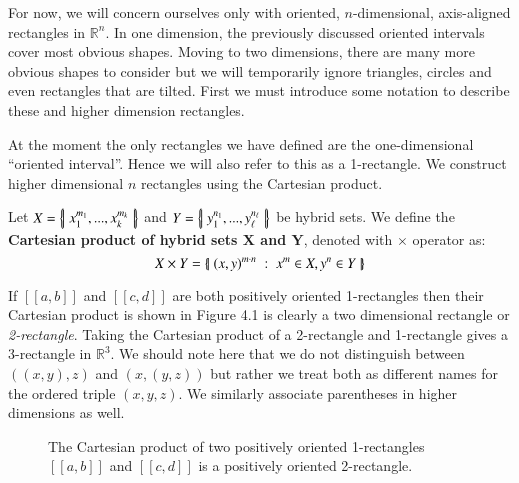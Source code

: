 For now, we will concern ourselves only with oriented, $n$-dimensional, axis-aligned rectangles in $\mathbb{R}^n$.
In one dimension, the previously discussed oriented intervals cover most obvious shapes.
Moving to two dimensions, there are many more obvious shapes to consider but we will temporarily ignore triangles, circles and even rectangles that are tilted.
First we must introduce some notation to describe these and higher dimension rectangles. 

At the moment the only rectangles we have defined are the one-dimensional ``oriented interval''.
Hence we will also refer to this as a 1-rectangle.
We construct higher dimensional $n$ rectangles using the Cartesian product.
\begin{definition}
	Let $X = \left\{ \! \left| \;  x_1^{m_1}, ... , x_k^{m_k}  \; \right| \! \right\}$ and $Y= \left\{ \! \left| \;  y_1^{n_1}, ... , y_\ell^{n_\ell}  \; \right| \! \right\}$ be hybrid sets.
	We define the \textbf{Cartesian product of hybrid sets $\boldsymbol{X}$ and $\boldsymbol{Y}$}, denoted with $\times$ operator as:
	\begin{equation}
		X \times Y = \left\{ \! \left| \;  (x, y)^{m \cdot n} \; : \; x^m \in X, y^n \in Y  \; \right| \! \right\}
	 \end{equation}
\end{definition}

If $[\![a,b]\!]$ and $[\![c,d]\!]$ are both positively oriented 1-rectangles then their Cartesian product is shown in Figure 4.1 is clearly a two dimensional rectangle or \emph{2-rectangle}. 
Taking the Cartesian product of a 2-rectangle and 1-rectangle gives a 3-rectangle in $\mathbb{R}^3$. 
We should note here that we do not distinguish between $((x,y),z)$ and $(x,(y,z))$ but rather we treat both as different names for the ordered triple $(x,y,z)$.
We similarly associate parentheses in higher dimensions as well.

\begin{figure}[h]
\caption[Cartesian product of two 1-rectangles]{The Cartesian product of two positively oriented 1-rectangles $[\![a,b]\!]$ and $[\![c,d]\!]$ is a positively oriented 2-rectangle.}
\centering
{}
\end{figure}


